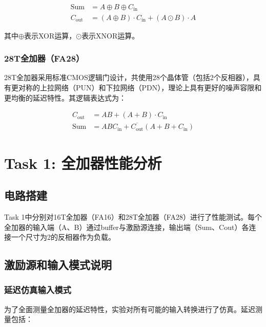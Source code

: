 \documentclass[UTF8,12pt,a4paper]{ctexart}
\begin{document}
\begin{align}
\text{Sum} &= A \oplus B \oplus C_{\text{in}} \\
C_{\text{out}} &= (A \oplus B) \cdot C_{\text{in}} + (A \odot B) \cdot A
\end{align}

其中$\oplus$表示XOR运算，$\odot$表示XNOR运算。

\subsubsection{28T全加器（FA28）}

28T全加器采用标准CMOS逻辑门设计，共使用28个晶体管（包括2个反相器），具有更对称的上拉网络（PUN）和下拉网络（PDN），理论上具有更好的噪声容限和更均衡的延迟特性。其逻辑表达式为：

\begin{align}
C_{\text{out}} &= AB + (A+B) \cdot C_{\text{in}} \\
\text{Sum} &= ABC_{\text{in}} + \overline{C_{\text{out}}}(A + B + C_{\text{in}})
\end{align}

\newpage
\section{Task 1: 全加器性能分析}

\subsection{电路搭建}

Task 1中分别对16T全加器（FA16）和28T全加器（FA28）进行了性能测试。每个全加器的输入端（A、B）通过buffer与激励源连接，输出端（Sum、Cout）各连接一个尺寸为2的反相器作为负载。

\subsection{激励源和输入模式说明}

\subsubsection{延迟仿真输入模式}

为了全面测量全加器的延迟特性，实验对所有可能的输入转换进行了仿真。延迟测量包括：
\end{document}
